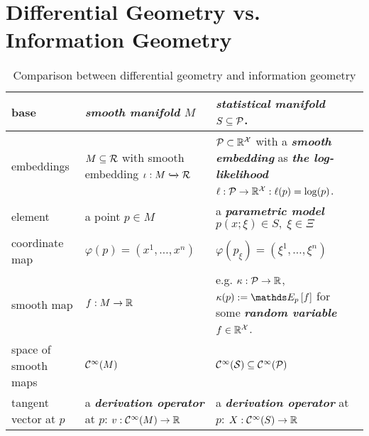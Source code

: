 \documentclass[11pt]{article}
\begin{document}
\section{Differential Geometry vs. Information Geometry}
\begin{table}[h!]
\setlength{\abovedisplayskip}{0pt}
\setlength{\belowdisplayskip}{-10pt}
\setlength{\abovedisplayshortskip}{0pt}
\setlength{\belowdisplayshortskip}{0pt}
\centering
\caption{Comparison between differential geometry and information geometry}
\label{tab: info_geometry}
\renewcommand\tabularxcolumn[1]{m{#1}}
\small
\begin{tabularx}{1\textwidth} { 
  | >{\raggedright\arraybackslash} m{3cm}
  | >{\centering\arraybackslash}X
  | >{\centering\arraybackslash}X  | }
 \hline
 base &  \emph{\textbf{smooth manifold}} $M$ & \emph{\textbf{statistical manifold}} $S \subseteq {\mathcal P}$.  \\
 \hline
 embeddings & $M \subseteq {\mathcal R}$ with smooth embedding $\iota: M \xhookrightarrow{} {\mathcal R}$ & ${\mathcal P} \subset {\mathbb R}^{{\mathcal X}}$ with a \emph{\textbf{smooth embedding}} as \emph{\textbf{the log-likelihood}} $\ell: {\mathcal P}  \rightarrow  {\mathbb R}^{{\mathcal X}}: \ell(p) = \log(p)$. \\
 \hline
 element  & a point $p \in M$ & a \emph{\textbf{parametric model}} $p(x; \xi) \in S, \;\xi \in \Xi $\\
 \hline
 coordinate map  & $\varphi(p) = (x^1, \ldots, x^{n})$ &  $\varphi(p_{\xi}) = (\xi^1, \ldots, \xi^{n})$ \\ 
\hline
smooth map & $f: M \rightarrow {\mathbb R}$ & e.g. $\kappa: {\mathcal P} \rightarrow {\mathbb R}$, $\kappa(p):=\E{p}{f}$ for some \emph{\textbf{random variable}} $f \in {\mathbb R}^{{\mathcal X}}$.
\\ 
\hline
 space of smooth maps & ${\mathcal C}^{\infty}(M)$ & ${\mathcal C}^{\infty}({\mathcal S}) \subseteq {\mathcal C}^{\infty}({\mathcal P})$ \\ %
\hline
tangent vector at $p$ &  a \emph{\textbf{derivation operator}} at $p$: $v: {\mathcal C}^{\infty}(M) \rightarrow {\mathbb R}$ &  a \emph{\textbf{derivation operator}} at $p$: $X: {\mathcal C}^{\infty}(S) \rightarrow {\mathbb R}$  \\ 

\end{tabularx}
\end{table}
\end{document}
